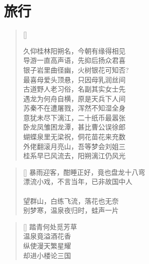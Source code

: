 \chapter{旅行}
\thispagestyle{empty}
\renewcommand{\poemtoc}{section}
\settowidth{\versewidth}{久仰桂林阳朔名，今朝有缘得相见}
\begin{verse}[\versewidth]

久仰桂林阳朔名，今朝有缘得相见\\
导游一直高声语，先抑后扬众君喜\\
银子岩里曲径幽，火树银花可知否?\\
最喜母爱头顶悬，只因母乳润丝间\\
古道野人老习俗，名副其实女士先\\
遇龙为何舟自横，原是天兵下人间\\
苏秦不在遭屠戮，浑然不知湿全身\\
意犹未尽下漓江，二十纸币最嚣张\\
卧龙凤雏困龙潭，甚比曹公误徐郎\\
蝴蝶泉里无梁祝，侗花苗花来充数\\
外佬翻滚月亮山，吾等梦会刘姐三\\
桂系早已风流去，阳朔漓江仍风光
\end{verse}

\renewcommand{\poemtoc}{section}
\settowidth{\versewidth}{久仰桂林阳朔名，今朝有缘得相见}
\begin{verse}[\versewidth]
暴雨迎客，酣睡正好，竟也盘龙十八弯\\
漂流小戏，不言当年，已非故国中人\\
~\\
望群山，白练飞流，落花也无奈\\
别梦寒，温泉夜归时，蛙声一片\\
\end{verse}

\renewcommand{\poemtoc}{section}
\settowidth{\versewidth}{踏青何处觅芳草}
\begin{verse}[\versewidth]
踏青何处觅芳草\\
温泉竟溢酒花香\\
纵使漫天繁星耀\\
却进小楼论三国
\end{verse}
